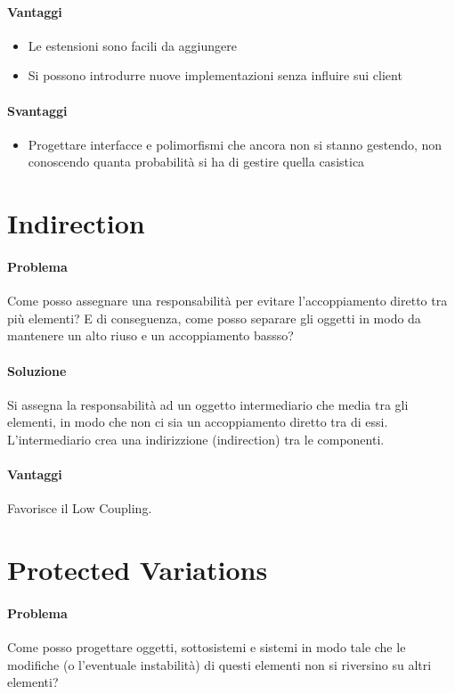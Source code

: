 \paragraph*{Vantaggi}
\begin{itemize}
    \item Le estensioni sono facili da aggiungere
    \item Si possono introdurre nuove implementazioni senza influire sui client
\end{itemize}
\paragraph*{Svantaggi}
\begin{itemize}
    \item Progettare interfacce e polimorfismi che ancora non si stanno gestendo, non conoscendo
    quanta probabilità si ha di gestire quella casistica
\end{itemize}
\section{Indirection}
\paragraph*{Problema} Come posso assegnare una responsabilità per evitare l'accoppiamento diretto
tra più elementi? E di conseguenza, come posso separare gli oggetti in modo da mantenere un alto
riuso e un accoppiamento bassso?
\paragraph*{Soluzione} Si assegna la responsabilità ad un oggetto intermediario che media tra gli
elementi, in modo che non ci sia un accoppiamento diretto tra di essi. L'intermediario crea una
indirizzione (indirection) tra le componenti.
\paragraph*{Vantaggi} Favorisce il Low Coupling.
\section{Protected Variations}
\paragraph*{Problema} Come posso progettare oggetti, sottosistemi e sistemi in modo tale che
le modifiche (o l'eventuale instabilità) di questi elementi non si riversino su altri elementi?
